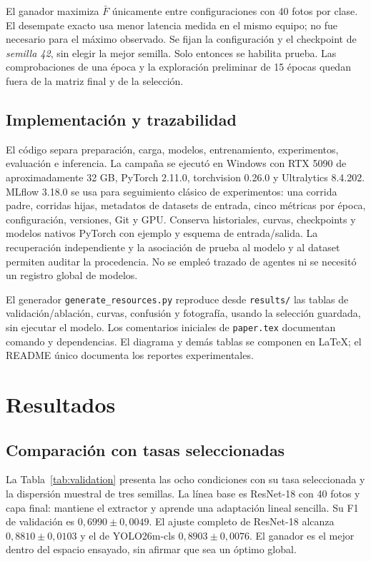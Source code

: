 \documentclass[conference]{IEEEtran}
\newcommand{\artifact}[1]{\texttt{\small #1}}
\begin{document}
El ganador maximiza $\bar F$ únicamente entre configuraciones con 40 fotos por clase. El desempate exacto usa menor latencia medida en el mismo equipo; no fue necesario para el máximo observado. Se fijan la configuración y el checkpoint de \emph{semilla 42}, sin elegir la mejor semilla. Solo entonces se habilita prueba. Las comprobaciones de una época y la exploración preliminar de 15 épocas quedan fuera de la matriz final y de la selección.

\subsection{Implementación y trazabilidad}
El código separa preparación, carga, modelos, entrenamiento, experimentos, evaluación e inferencia. La campaña se ejecutó en Windows con RTX 5090 de aproximadamente 32 GB, PyTorch 2.11.0, torchvision 0.26.0 y Ultralytics 8.4.202. MLflow 3.18.0 se usa para seguimiento clásico de experimentos: una corrida padre, corridas hijas, metadatos de datasets de entrada, cinco métricas por época, configuración, versiones, Git y GPU. Conserva historiales, curvas, checkpoints y modelos nativos PyTorch con ejemplo y esquema de entrada/salida. La recuperación independiente y la asociación de prueba al modelo y al dataset permiten auditar la procedencia. No se empleó trazado de agentes ni se necesitó un registro global de modelos.

El generador \artifact{generate\_resources.py} reproduce desde \artifact{results/} las tablas de validación/ablación, curvas, confusión y fotografía, usando la selección guardada, sin ejecutar el modelo. Los comentarios iniciales de \artifact{paper.tex} documentan comando y dependencias. El diagrama y demás tablas se componen en LaTeX; el README único documenta los reportes experimentales.

\section{Resultados}
\subsection{Comparación con tasas seleccionadas}
La Tabla~\ref{tab:validation} presenta las ocho condiciones con su tasa seleccionada y la dispersión muestral de tres semillas. La línea base es ResNet-18 con 40 fotos y capa final: mantiene el extractor y aprende una adaptación lineal sencilla. Su F1 de validación es $0{,}6990\pm0{,}0049$. El ajuste completo de ResNet-18 alcanza $0{,}8810\pm0{,}0103$ y el de YOLO26m-cls $0{,}8903\pm0{,}0076$. El ganador es el mejor dentro del espacio ensayado, sin afirmar que sea un óptimo global.
\end{document}
